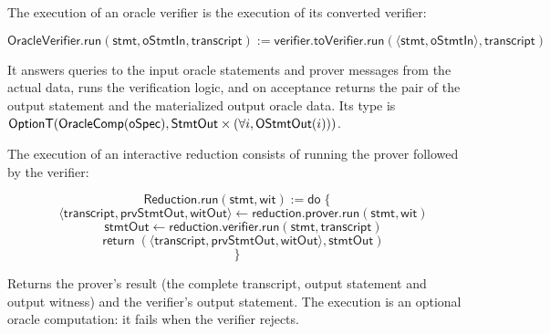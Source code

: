 \begin{definition}
    \label{def:oracle_verifier_run}
    The execution of an oracle verifier is the execution of its converted verifier:

    \begin{equation*} \mathsf{OracleVerifier}.\mathsf{run}(\mathsf{stmt}, \mathsf{oStmtIn}, \mathsf{transcript}) := \mathsf{verifier}.\mathsf{toVerifier}.\mathsf{run}(\langle \mathsf{stmt}, \mathsf{oStmtIn} \rangle, \mathsf{transcript}) \end{equation*}

    It answers queries to the input oracle statements and prover messages from the actual data,
    runs the verification logic, and on acceptance returns the pair of the output statement and
    the materialized output oracle data. Its type is
    \(\mathsf{OptionT}(\mathsf{OracleComp}(\mathsf{oSpec}), \mathsf{StmtOut} \times (\forall i, \mathsf{OStmtOut}(i)))\).
    \leanok
\end{definition}

\begin{definition}
    \label{def:reduction_run}
    The execution of an interactive reduction consists of running the prover followed by the verifier:

    \begin{equation*} \mathsf{Reduction}.\mathsf{run}(\mathsf{stmt}, \mathsf{wit}) := \mathsf{do} \; \{ \end{equation*}
    \begin{equation*} \quad \langle \mathsf{transcript}, \mathsf{prvStmtOut}, \mathsf{witOut} \rangle \leftarrow \mathsf{reduction}.\mathsf{prover}.\mathsf{run}(\mathsf{stmt}, \mathsf{wit}) \end{equation*}
    \begin{equation*} \quad \mathsf{stmtOut} \leftarrow \mathsf{reduction}.\mathsf{verifier}.\mathsf{run}(\mathsf{stmt}, \mathsf{transcript}) \end{equation*}
    \begin{equation*} \quad \mathsf{return} \; (\langle \mathsf{transcript}, \mathsf{prvStmtOut}, \mathsf{witOut} \rangle, \mathsf{stmtOut}) \end{equation*}
    \begin{equation*} \} \end{equation*}

    Returns the prover's result (the complete transcript, output statement and output witness)
    and the verifier's output statement. The execution is an optional oracle computation: it fails
    when the verifier rejects.
    \leanok
\end{definition}

